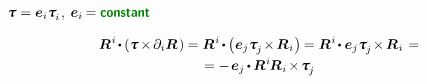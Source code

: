 \begin{otherlanguage}{russian}
\noindent
${\cauchystress = \bm{e}_{i} \tractionvector{i}\hspace{.12ex}}$, ${\bm{e}_i \hspace{-0.16ex} = \boldconstant}$

\nopagebreak\vspace{-0.2em}\begin{multline*}
\bm{R}^{\hspace{.1ex}i} \hspace{-0.25ex} \dotp \hspace{-0.1ex} \left( \cauchystress \hspace{-0.2ex} \times \hspace{-0.2ex} \partial_i \bm{R} \hspace{.24ex} \right) \hspace{-0.1ex}
= \bm{R}^{\hspace{.1ex}i} \hspace{-0.2ex} \dotp \hspace{-0.1ex} \left( \hspace{.1ex} \bm{e}_{j} \tractionvector{j} \hspace{-0.2ex} \times \hspace{-0.2ex} \bm{R}_{\hspace{.1ex}i} \hspace{.12ex} \right) \hspace{-0.16ex}
= \bm{R}^{\hspace{.1ex}i} \hspace{-0.25ex} \dotp \bm{e}_{j} \tractionvector{j} \hspace{-0.2ex} \times \hspace{-0.2ex} \bm{R}_{\hspace{.1ex}i} \hspace{.2ex} =
\\[-0.15em]
= - \hspace{.25ex} \bm{e}_{j} \hspace{-0.15ex} \dotp \hspace{-0.1ex} \bm{R}^{\hspace{.1ex}i} \hspace{-0.2ex} \bm{R}_{\hspace{.1ex}i} \hspace{-0.25ex} \times \hspace{-0.25ex} \tractionvector{j}

\end{multline*}
\end{otherlanguage}
